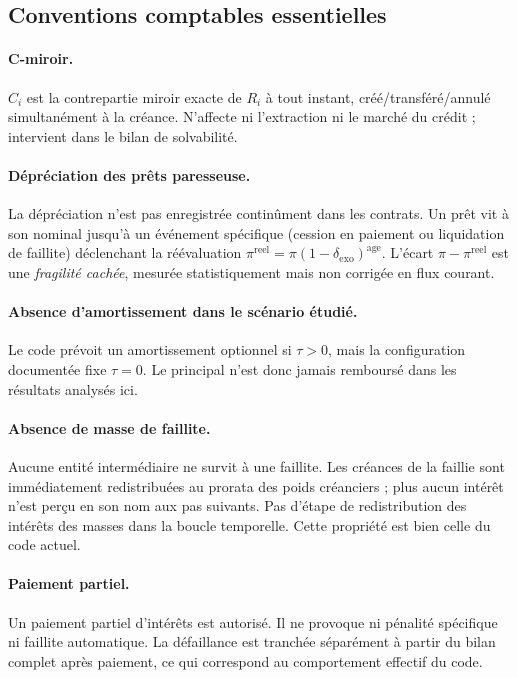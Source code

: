 \documentclass[10pt,a4paper]{article}
\begin{document}
\subsection{Conventions comptables essentielles}

\paragraph{C-miroir.} \(C_i\) est la contrepartie miroir exacte de \(R_i\) à tout instant, créé/transféré/annulé simultanément à la créance. N'affecte ni l'extraction ni le marché du crédit ; intervient dans le bilan de solvabilité.

\paragraph{Dépréciation des prêts paresseuse.} La dépréciation n'est pas enregistrée continûment dans les contrats. Un prêt vit à son nominal jusqu'à un événement spécifique (cession en paiement ou liquidation de faillite) déclenchant la réévaluation \(\pi^{\mathrm{reel}}=\pi(1-\delta_{\mathrm{exo}})^{\mathrm{age}}\). L'écart \(\pi-\pi^{\mathrm{reel}}\) est une \emph{fragilité cachée}, mesurée statistiquement mais non corrigée en flux courant.

\paragraph{Absence d'amortissement dans le scénario étudié.} Le code prévoit un amortissement optionnel si \(\tau>0\), mais la configuration documentée fixe \(\tau=0\). Le principal n'est donc jamais remboursé dans les résultats analysés ici.

\paragraph{Absence de masse de faillite.} Aucune entité intermédiaire ne survit à une faillite. Les créances de la faillie sont immédiatement redistribuées au prorata des poids créanciers ; plus aucun intérêt n'est perçu en son nom aux pas suivants. Pas d'étape de \og redistribution des intérêts des masses \fg{} dans la boucle temporelle. Cette propriété est bien celle du code actuel.

\paragraph{Paiement partiel.} Un paiement partiel d'intérêts est autorisé. Il ne provoque ni pénalité spécifique ni faillite automatique. La défaillance est tranchée séparément à partir du bilan complet après paiement, ce qui correspond au comportement effectif du code.
\end{document}
